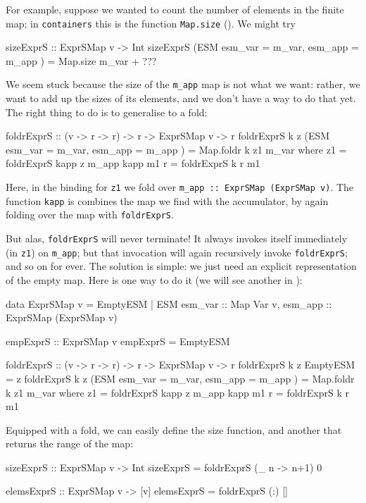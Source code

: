 \documentclass[acmsmall]{acmart}
\theoremstyle{theorem}
\theoremstyle{definition}
\theoremstyle{remark}
\begin{document}
For example, suppose we wanted to count the number of elements in the finite map; in \lstinline{containers}
this is the function \lstinline{Map.size} ().  We might try
\begin{code}
  sizeExprS :: ExprSMap v -> Int
  sizeExprS (ESM { esm_var = m_var, esm_app = m_app })
    = Map.size m_var + ???
\end{code}
We seem stuck because the size of the \lstinline{m_app} map is not what we want: rather,
we want to add up the sizes of its elements, and we don't have a way to do that yet.
The right thing to do is to generalise to a fold:
\begin{code}
  foldrExprS :: (v -> r -> r) -> r -> ExprSMap v -> r
  foldrExprS k z (ESM { esm_var = m_var, esm_app = m_app })
    = Map.foldr k z1 m_var
    where
      z1 = foldrExprS kapp z m_app
      kapp m1 r = foldrExprS k r m1
\end{code}
Here, in the binding for \lstinline{z1} we fold over \lstinline{m_app :: ExprSMap (ExprSMap v)}.
The function \lstinline{kapp} is combines the map we find with the accumulator, by again
folding over the map with \lstinline{foldrExprS}.

But alas, \lstinline{foldrExprS} will never terminate!  It always invokes itself immediately
(in \lstinline{z1}) on \lstinline{m_app}; but that invocation will again recursively invoke
\lstinline{foldrExprS}; and so on for ever.
The solution is simple: we just need an explicit representation of the empty map.
Here is one way to do it (we will see another in ):
\begin{code}
data ExprSMap v = EmptyESM
                | ESM { esm_var :: Map Var v, esm_app :: ExprSMap (ExprSMap v) }

empExprS :: ExprSMap v
empExprS = EmptyESM

foldrExprS :: (v -> r -> r) -> r -> ExprSMap v -> r
foldrExprS k z EmptyESM                                   = z
foldrExprS k z (ESM { esm_var = m_var, esm_app = m_app }) = Map.foldr k z1 m_var
  where
    z1 = foldrExprS kapp z m_app
    kapp m1 r = foldrExprS k r m1
\end{code}
Equipped with a fold, we can easily define the size function, and another
that returns the range of the map:
\begin{code}
  sizeExprS :: ExprSMap v -> Int
  sizeExprS = foldrExprS (\_ n -> n+1) 0

  elemsExprS :: ExprSMap v -> [v]
  elemsExprS = foldrExprS (:) []
\end{code}
\end{document}
